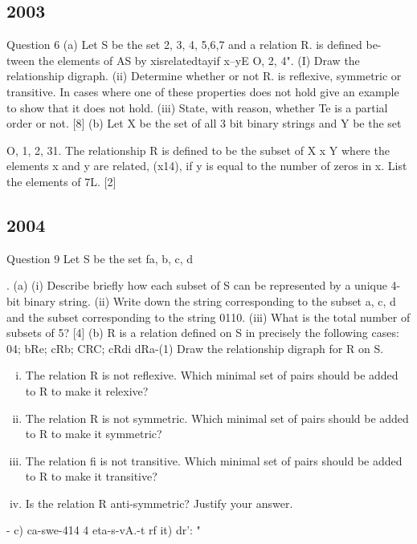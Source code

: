 \documentclass[a4paper,12pt]{article}
\begin{document}
\subsection{2003}
Question 6 (a) Let S be the set {2, 3, 4, 5,6,7} and a relation R. is defined be-
tween the elements of AS by 
xisrelatedtayif x--yE {O, 2, 4}". 
(I) Draw the relationship digraph. 
(ii) Determine whether or not R. is reflexive, symmetric or transitive. In cases 
where one of these properties does not hold give an example to show that 
it does not hold. 
(iii) State, with reason, whether Te is a partial order or not. 
[8] 
(b) Let X be the set of all 3 bit binary strings and Y be the set {O, 1, 2, 31. The 
relationship R is defined to be the subset of X x Y where the elements x and y 
are related, (x14), if y is equal to the number of zeros in x. List the elements 
of 7L. [2] 

\subsection{2004} 
Question 9 Let S be the set fa, b, c, d}. 
(a) (i) Describe briefly how each subset of S can be represented by a unique 4-bit 
binary string. 
(ii) Write down the string corresponding to the subset {a, c, d} and the subset 
corresponding to the string 0110. 
(iii) What is the total number of subsets of 5? [4] 
(b) R is a relation defined on S in precisely the following cases: 
04; bRe; cRb; CRC; cRdi dRa-(1) Draw the relationship digraph for R on S. 
\begin{enumerate}[(i)]
\item  The relation R is not reflexive. Which minimal set of pairs should be 
added to R to make it relexive? 
\item  The relation R is not symmetric. Which minimal set of pairs should be 
added to R to make it symmetric? 
\item  The relation fi is not transitive. Which minimal set of pairs should be 
added to R to make it transitive? 
\item Is the relation R anti-symmetric? Justify your answer. 
\end{enumerate}


- c) ca-swe-414 4 eta-s-vA.-t rf it) dr': "%
\end{document}
